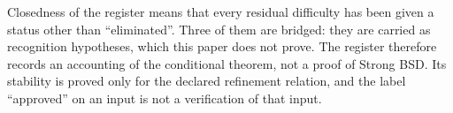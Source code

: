 \begin{remark}\label{rmk:closure:aor-partial-status}
Closedness of the register means that every residual difficulty has been
given a status other than ``eliminated''.  Three of them are bridged:
they are carried as recognition hypotheses, which this paper does not
prove.  The register therefore records an accounting of the conditional
theorem, not a proof of Strong BSD.  Its stability is proved only for the
declared refinement relation, and the label ``approved'' on an input is
not a verification of that input.
\end{remark}

